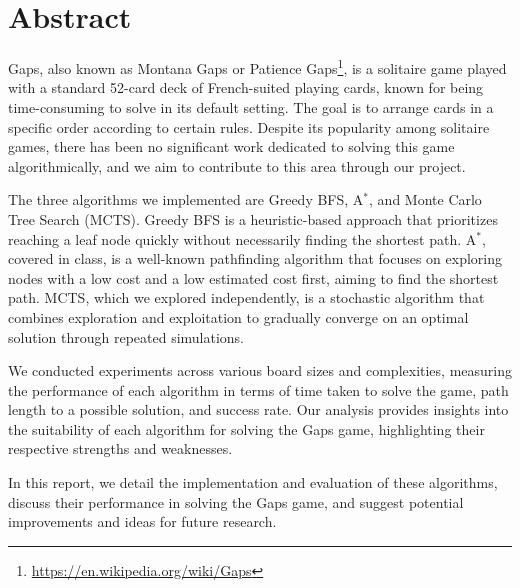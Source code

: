 \chapter{Abstract}
Gaps, also known as Montana Gaps or Patience Gaps\footnote{\url{https://en.wikipedia.org/wiki/Gaps}}, is a solitaire game played with a standard 52-card deck of French-suited playing cards, known for being time-consuming to solve in its default setting. The goal is to arrange cards in a specific order according to certain rules. Despite its popularity among solitaire games, there has been no significant work dedicated to solving this game algorithmically, and we aim to contribute to this area through our project.

The three algorithms we implemented are Greedy BFS, A$^*$, and Monte Carlo Tree Search (MCTS). Greedy BFS is a heuristic-based approach that prioritizes reaching a leaf node quickly without necessarily finding the shortest path. A$^*$, covered in class, is a well-known pathfinding algorithm that focuses on exploring nodes with a low cost and a low estimated cost first, aiming to find the shortest path. MCTS, which we explored independently, is a stochastic algorithm that combines exploration and exploitation to gradually converge on an optimal solution through repeated simulations.

We conducted experiments across various board sizes and complexities, measuring the performance of each algorithm in terms of time taken to solve the game, path length to a possible solution, and success rate. Our analysis provides insights into the suitability of each algorithm for solving the Gaps game, highlighting their respective strengths and weaknesses.

In this report, we detail the implementation and evaluation of these algorithms, discuss their performance in solving the Gaps game, and suggest potential improvements and ideas for future research.
